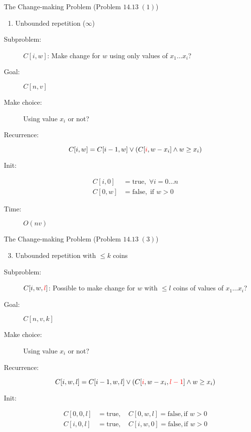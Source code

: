 \begin{frame}{}
  \begin{exampleblock}{The Change-making Problem (Problem $14.13\; (1)$)}
    \begin{enumerate}[(1)]
      \item Unbounded repetition ($\infty$)
    \end{enumerate}
  \end{exampleblock}

  \pause
  \begin{description}
    \item[Subproblem:] $C[i, w]$: Make change for $w$ using only values of $x_{1} \dots x_{i}$?
    \item[Goal:] $C[n,v]$
      \pause
    \item[Make choice:] Using value $x_{i}$ or not?
    \item[Recurrence:] 
      \[
	C[i,w] = C[i-1, w] \lor (C[\textcolor{red}{i}, w-x_{i}] \land w \ge x_{i})
      \]
      \pause
    \item[Init:]
      \begin{align*}
		C[i,0] &= \text{true}, \; \forall i = 0 \dots n  \\
		C[0,w] &= \text{false}, \; \text{if } w > 0
      \end{align*}
    \item[Time:] $O(nv)$
  \end{description}
\end{frame}

\begin{frame}{}
  \begin{exampleblock}{The Change-making Problem (Problem $14.13\; (3)$)}
    \begin{enumerate}[(1)]
      \setcounter{enumi}{2}
      \item Unbounded repetition with $\le k$ coins
    \end{enumerate}
  \end{exampleblock}

  \pause
  \begin{description}
	\item[Subproblem:] $C[i,w,\textcolor{red}{l}]$: Possible to make change for $w$ with $\le l$ coins of values of $x_{1} \dots x_{i}$?
	\item[Goal:] $C[n,v,k]$
	  \pause
	\item[Make choice:] Using value $x_{i}$ or not? 
	\item[Recurrence:] 
	  \[
		C[i,w,l] = C[i-1,w,l] \lor \left( C[\textcolor{red}{i}, w-x_{i}, \textcolor{red}{l-1}] \land w \ge x_{i} \right)
	  \]
	  \pause
	\item[Init:]
	  \begin{align*}
		C[0,0,l] &= \text{true}, \quad C[0,w,l] = \text{false}, \text{if } w > 0 \\
		C[i,0,l] &= \text{true}, \quad C[i,w,0] = \text{false}, \text{if } w > 0
	  \end{align*}
  \end{description}
\end{frame}
